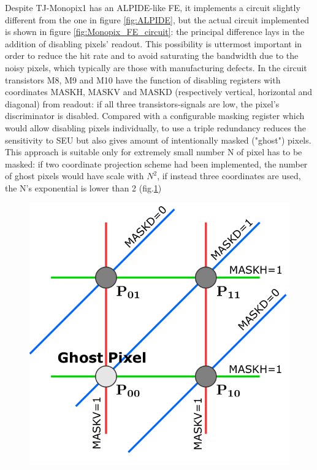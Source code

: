             Despite TJ-Monopix1 has an ALPIDE-like FE, it implements a circuit slightly different from the one in figure \ref{fig:ALPIDE}, but the actual circuit implemented is shown in figure \ref{fig:Monopix_FE_circuit}: the principal difference lays in the addition of disabling pixels' readout. This possibility is uttermost important in order to reduce the hit rate and to avoid saturating the bandwidth due to the noisy pixels, which typically are those with manufacturing defects.
            In the circuit transistors M8, M9 and M10 have the function of disabling registers with coordinates MASKH, MASKV and MASKD (respectively vertical, horizontal and diagonal) from readout: if all three transistors-signals are low, the pixel's discriminator is disabled. 
            Compared with a configurable masking register which would allow disabling pixels individually, to use a triple redundancy reduces the sensitivity to SEU but also gives amount of intentionally masked ("ghost") pixels.
            This approach is suitable only for extremely small number N of pixel has to be masked: if two coordinate projection scheme had been implemented, the number of ghost pixels would have scale with $N^2$, if instead three coordinates are used, the N's exponential is lower than 2 (fig.\ref{fig:masking_scheme})
            \begin{figure}[h!]
                \centering
                \includegraphics[width=.3\linewidth]{figures/Monopix1/masking_scheme.png}
                \caption{}
                \label{fig:masking_scheme}
            \end{figure}

